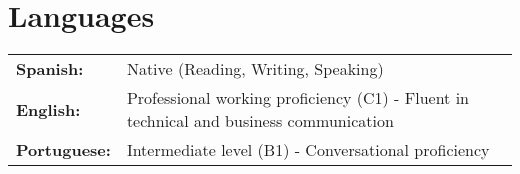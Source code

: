 \documentclass[11pt,a4paper]{article}
\begin{document}
\section{Languages}
\begin{tabularx}{\textwidth}{@{}l X@{}}
\textbf{Spanish:} & Native (Reading, Writing, Speaking) \\
\textbf{English:} & Professional working proficiency (C1) - Fluent in technical and business communication \\
\textbf{Portuguese:} & Intermediate level (B1) - Conversational proficiency
\end{tabularx}
\end{document}
